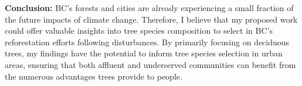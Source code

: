 \documentclass[11pt,letter]{article}
\begin{document}
\textbf{Conclusion:} BC’s forests and cities are already experiencing a small fraction of the future impacts of climate change. Therefore, I believe that my proposed work could offer valuable insights into tree species composition to select in BC's reforestation efforts following disturbances. By primarily focusing on deciduous trees, my findings have the potential to inform tree species selection in urban areas, ensuring that both affluent and underserved communities can benefit from the numerous advantages trees provide to people.

\end{document}
